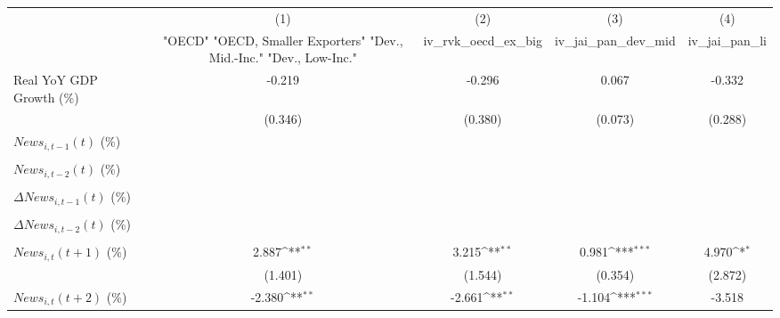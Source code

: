 {
\def\sym#1{\ifmmode^{#1}\else\(^{#1}\)\fi}
\begin{tabular}{l*{4}{c}}
\toprule
                    &\multicolumn{1}{c}{(1)}&\multicolumn{1}{c}{(2)}&\multicolumn{1}{c}{(3)}&\multicolumn{1}{c}{(4)}\\
                    &\multicolumn{1}{c}{ "OECD" "OECD, Smaller Exporters" "Dev., Mid.-Inc." "Dev., Low-Inc."}&\multicolumn{1}{c}{iv_rvk_oecd_ex_big}&\multicolumn{1}{c}{iv_jai_pan_dev_mid}&\multicolumn{1}{c}{iv_jai_pan_li}\\
\midrule
Real YoY GDP Growth (\%)&      -0.219         &      -0.296         &       0.067         &      -0.332         \\
                    &     (0.346)         &     (0.380)         &     (0.073)         &     (0.288)         \\
\addlinespace
$ News_{i,t-1}(t)$ (\%)&                     &                     &                     &                     \\
                    &                     &                     &                     &                     \\
\addlinespace
$ News_{i,t-2}(t)$ (\%)&                     &                     &                     &                     \\
                    &                     &                     &                     &                     \\
\addlinespace
$ \Delta News_{i,t-1}(t)$ (\%)&                     &                     &                     &                     \\
                    &                     &                     &                     &                     \\
\addlinespace
$ \Delta News_{i,t-2}(t)$ (\%)&                     &                     &                     &                     \\
                    &                     &                     &                     &                     \\
\addlinespace
$ News_{i,t}(t+1)$ (\%)&       2.887\sym{**} &       3.215\sym{**} &       0.981\sym{***}&       4.970\sym{*}  \\
                    &     (1.401)         &     (1.544)         &     (0.354)         &     (2.872)         \\
\addlinespace
$ News_{i,t}(t+2)$ (\%)&      -2.380\sym{**} &      -2.661\sym{**} &      -1.104\sym{***}&      -3.518         \\

\end{tabular}}
